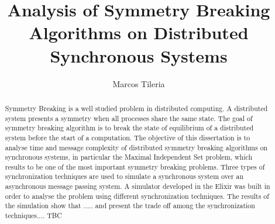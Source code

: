 \documentclass[11pt]{article} %
\title{Analysis of Symmetry Breaking Algorithms on Distributed Synchronous Systems}
\author{Marcos Tileria}
\theoremstyle{plain}
\theoremstyle{definition}
\begin{document}
\maketitle

\declaration

\begin{abstract}
  
 Symmetry Breaking is a well studied problem in distributed computing. A distributed system presents a symmetry when all processes share the same state. The goal of symmetry breaking algorithm  is to break the state of equilibrium of a distributed system before the start of a computation. The objective of this dissertation is to analyse time and message complexity of distributed symmetry breaking algorithms on synchronous systems, in particular the Maximal Independent Set problem, which results to be one of the most important symmetry breaking problems. Three types of synchronization techniques are used to simulate a synchronous system over an asynchronous message passing system. A simulator developed in the Elixir was built in order to analyse the problem using different synchronization techniques. The results of the simulation show that ..... and present the trade off among the synchronization techniques.... TBC
  

\end{abstract}




 \newpage




 \newpage


\newpage


 \newpage


 \newpage


 \newpage


 \newpage




\end{document}
